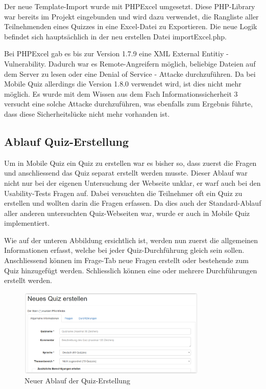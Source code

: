 \bigskip

Der neue Template-Import wurde mit PHPExcel \cite{phpexcel} umgesetzt. Diese PHP-Library war bereits im Projekt eingebunden und wird dazu verwendet, die Rangliste aller Teilnehmenden eines Quizzes in eine Excel-Datei zu Exportieren. Die neue Logik befindet sich hauptsächlich in der neu erstellen Datei \glqq importExcel.php\grqq.

\bigskip

Bei PHPExcel gab es bis zur Version 1.7.9 eine \gls{XML External Entitiy} - \gls{Vulnerability}. Dadurch war es Remote-Angreifern möglich, beliebige Dateien auf dem Server zu lesen oder eine \gls{Denial of Service} - Attacke durchzuführen. \cite{cvedetails_phpexcel}
Da bei Mobile Quiz allerdings die Version 1.8.0 verwendet wird, ist dies nicht mehr möglich. Es wurde mit dem Wissen aus dem Fach Informationssicherheit 3 versucht eine solche Attacke durchzuführen, was ebenfalls zum Ergebnis führte, dass diese Sicherheitslücke nicht mehr vorhanden ist.



\subsection{Ablauf Quiz-Erstellung}
\label{subsec:quiz-erstellung}

Um in Mobile Quiz ein Quiz zu erstellen war es bisher so, dass zuerst die Fragen und anschliessend das Quiz separat erstellt werden musste. Dieser Ablauf war nicht nur bei der eigenen Untersuchung der Webseite unklar, er warf auch bei den Usability-Tests Fragen auf. Dabei versuchten die Teilnehmer oft ein Quiz zu erstellen und wollten darin die Fragen erfassen. Da dies auch der Standard-Ablauf aller anderen untersuchten Quiz-Webseiten war, wurde er auch in Mobile Quiz implementiert.

Wie auf der unteren Abbildung ersichtlich ist, werden nun zuerst die allgemeinen Informationen erfasst, welche bei jeder Quiz-Durchführung gleich sein sollen. Anschliessend können im Frage-Tab neue Fragen erstellt oder bestehende zum Quiz hinzugefügt werden. Schliesslich können eine oder mehrere Durchführungen erstellt werden.

\begin{figure}[H]
	\centering
	\includegraphics[width=0.8\textwidth]{Images/Quiz_Erstellen1.PNG}
	\caption{Neuer Ablauf der Quiz-Erstellung}
\end{figure}

